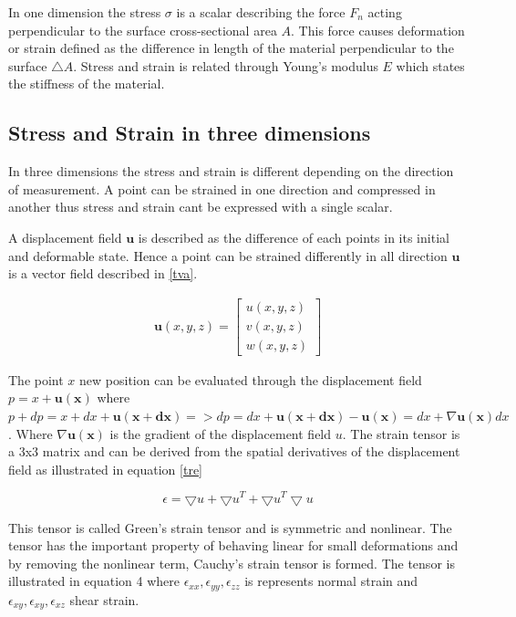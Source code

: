 \documentclass[10pt,a4paper]{article}
\begin{document}
In one dimension the stress $\sigma$ is a scalar describing the force $ F_{n}$ acting perpendicular to the surface cross-sectional area $A$.
This force causes deformation or strain defined as the difference in length of the material perpendicular to the surface $\triangle A$. Stress and strain is related through Young's modulus $E$ which states the stiffness of the material.

\subsection{Stress and Strain in three dimensions}\label{stressnstrain}
In three dimensions the stress and strain is different depending on the direction of measurement. A point can be strained in one direction and compressed in another thus stress and strain cant be expressed with a single scalar.

A displacement field $\mathbf{u}$ is described as the difference of each points in its initial and deformable state. Hence a point can be strained differently in all direction $\mathbf{u}$ is a vector field described in \ref{tva}.


\begin{eqnarray}\label{tva}
    \mathbf{u}(x, y, z) = \left[ \begin{array}{c}
u(x, y, z) \\
v(x, y, z) \\
w(x, y, z) \end{array} \right]
\end{eqnarray}

The point $x$ new position can be evaluated through the displacement field $p=x+\mathbf{u(x)}$
where $p+dp = x+dx + \mathbf{u(x+dx)} => dp = dx + \mathbf{u(x+dx)}-\mathbf{u(x)} = dx +\nabla \mathbf{u(x)}dx$. Where $\nabla \mathbf{u(x)}$ is the gradient of the displacement field $u$. The strain tensor is a 3x3 matrix and can be derived from the spatial derivatives of the displacement field as illustrated in equation \ref{tre}

\begin{equation}\label{tre}
    \epsilon = \bigtriangledown u + \bigtriangledown u^{T} + \bigtriangledown u^{T} \bigtriangledown u
\end{equation}

This tensor is called Green’s strain tensor and is symmetric and nonlinear. The tensor has the important property of behaving linear for small deformations
and by removing the nonlinear term, Cauchy’s strain tensor is formed. The tensor is illustrated in equation 4 where $\epsilon_{xx}, \epsilon_{yy}, \epsilon_{zz}$ is represents normal strain and $\epsilon_{xy}, \epsilon_{xy}, \epsilon_{xz}$  shear strain.
\end{document}

